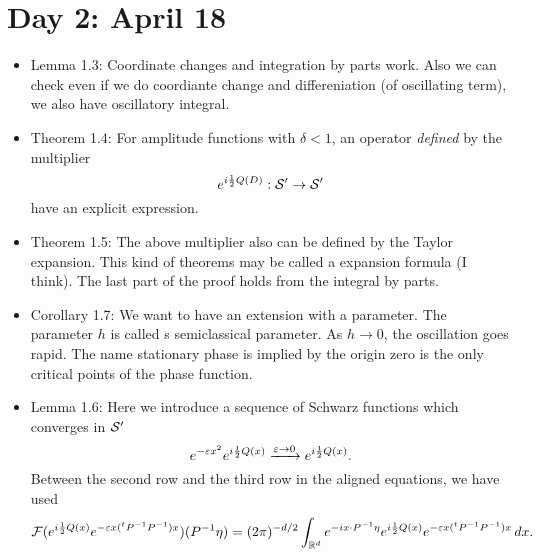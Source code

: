 \documentclass{../../small}
\begin{document}
\section{Day 2: April 18}
\begin{itemize}
\item Lemma 1.3:
Coordinate changes and integration by parts work.
Also we can check even if we do coordiante change and differeniation (of oscillating term), we also have oscillatory integral.
\item Theorem 1.4:
For amplitude functions with $\delta<1$, an operator \emph{defined} by the multiplier
\[e^{i\frac12Q(D)}:\mathcal{S}'\to\mathcal{S}'\]
have an explicit expression.
\item Theorem 1.5:
The above multiplier also can be defined by the Taylor expansion.
This kind of theorems may be called a expansion formula (I think).
The last part of the proof holds from the integral by parts.
\item Corollary 1.7:
We want to have an extension with a parameter.
The parameter $h$ is called s semiclassical parameter.
As $h\to0$, the oscillation goes rapid.
The name stationary phase is implied by the origin zero is the only critical points of the phase function.
\item Lemma 1.6:
Here we introduce a sequence of Schwarz functions which converges in $\mathcal{S}'$
\[e^{-\varepsilon x^2}e^{i\frac12Q(x)}\xrightarrow{\varepsilon\to0}e^{i\frac12Q(x)}.\]
Between the second row and the third row in the aligned equations, we have used
\[\mathcal{F}(e^{i\frac12Q(x)}e^{-\varepsilon x({}^tP^{-1}P^{-1})x})(P^{-1}\eta)=(2\pi)^{-d/2}\int_{\mathbb{R}^d}e^{-ix\cdot P^{-1}\eta}e^{i\frac12Q(x)}e^{-\varepsilon x({}^tP^{-1}P^{-1})x}\,dx.\]
\end{itemize}
\end{document}
